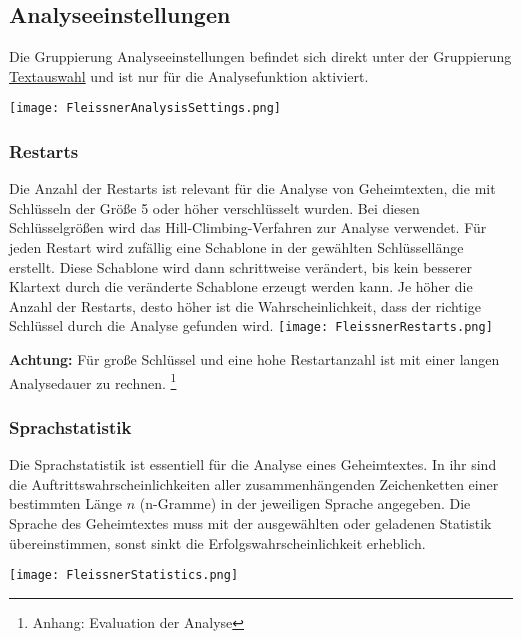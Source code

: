 \documentclass[fontsize=12pt, DIV=15, parskip=half-]{scrartcl}
\theoremstyle{break}
\begin{document}
\subsection{Analyseeinstellungen}
Die Gruppierung \glqq Analyseeinstellungen\grqq{} befindet sich direkt unter der Gruppierung \glqq\hyperlink{txtausw}{Textauswahl}\grqq{} und ist nur für die Analysefunktion aktiviert.

\texttt{[image: FleissnerAnalysisSettings.png]}


\subsubsection{Restarts}
Die Anzahl der Restarts ist relevant für die Analyse von Geheimtexten, die mit Schlüsseln der Größe 5 oder höher verschlüsselt wurden. Bei diesen Schlüsselgrößen wird das \glqq Hill-Climbing\grqq -Verfahren zur Analyse verwendet. Für jeden Restart wird zufällig eine Schablone in der gewählten Schlüssellänge erstellt. Diese Schablone wird dann schrittweise verändert, bis kein besserer Klartext durch die veränderte Schablone erzeugt werden kann. Je höher die Anzahl der Restarts, desto höher ist die Wahrscheinlichkeit, dass der richtige Schlüssel durch die Analyse gefunden wird.
\texttt{[image: FleissnerRestarts.png]}

\textbf{Achtung:} Für große Schlüssel und eine hohe Restartanzahl ist mit einer langen Analysedauer zu rechnen. \footnote{Anhang: Evaluation der Analyse}

\subsubsection{Sprachstatistik}
Die Sprachstatistik ist essentiell für die Analyse eines Geheimtextes. In ihr sind die Auftrittswahrscheinlichkeiten aller zusammenhängenden Zeichenketten einer bestimmten Länge $n$ (n-Gramme) in der jeweiligen Sprache angegeben. Die Sprache des Geheimtextes muss mit der ausgewählten oder geladenen Statistik übereinstimmen, sonst sinkt die Erfolgswahrscheinlichkeit erheblich.

\texttt{[image: FleissnerStatistics.png]}
\end{document}
